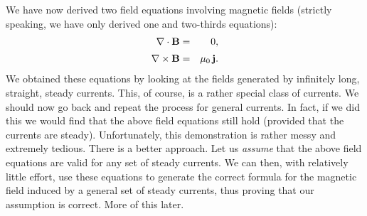 We have now derived two field equations involving magnetic fields (strictly speaking,
we have only derived one
and two-thirds equations):
\begin{eqnarray}
\nabla\cdot{\bf B} &=& 0,\label{e3105a}\\[0.5ex]
\nabla\times{\bf B} &=& \mu_0 \,{\bf j}.\label{e3105b}
\end{eqnarray}
We obtained these equations by looking at the fields generated by infinitely
long, straight, steady  currents. This, of course, is a rather special class of
currents. We should now go back and repeat the process for general currents.
In fact, 
if we did this we would find that the above field equations still hold (provided
that the currents are steady). Unfortunately, this
demonstration is rather messy and extremely tedious. There is a better approach.
Let us {\em assume}\/ that the above field equations are valid for any 
set of steady currents. 
We can then, with relatively little effort, 
use these equations to generate the correct formula for the magnetic field
induced by a general set of steady currents, thus proving that our assumption
is correct. More of this later.


